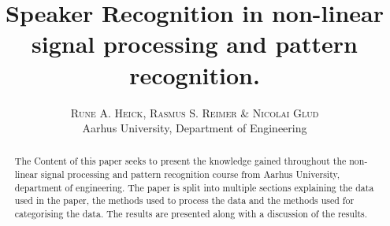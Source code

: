 

\title{\vspace{-15mm}\fontsize{24pt}{10pt}\selectfont\textbf{Speaker Recognition in non-linear signal processing and pattern recognition.}} %

\author{
\large
\textsc{Rune A. Heick, Rasmus S. Reimer \& Nicolai Glud}\\[2mm] %
\normalsize Aarhus University, Department of Engineering \\ %
\vspace{-5mm}
}
\date{}




\maketitle %
\thispagestyle{fancy} %
\raggedright


\begin{abstract}
The Content of this paper seeks to present the knowledge gained throughout the non-linear signal processing and pattern recognition course from Aarhus University, department of engineering. The paper is split into multiple sections explaining the data used in the paper, the methods used to process the data and the methods used for categorising the data. The results are presented along with a discussion of the results.
\end{abstract}







